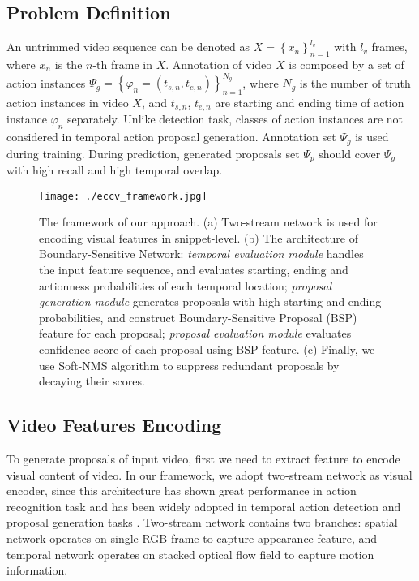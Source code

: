 \documentclass[runningheads]{llncs}
\begin{document}
\subsection{Problem Definition}


An untrimmed video sequence can be denoted as $X=\left \{ x_n \right \}_{n=1}^{l_v}$ with $l_v$  frames, where $x_n$ is the $n$-th frame in $X$.
Annotation of video $X$ is composed by a set of action instances $\Psi_g  = \left \{ \varphi  _n=\left (t_{s,n},t_{e,n}   \right ) \right \}_{n=1}^{N_g}$, where $N_g$ is the number of truth action instances in video  $X$, and $t_{s,n}$, $t_{e,n} $ are starting and ending time of action instance $\varphi_n$ separately.
Unlike  detection task, classes of action instances are not considered in temporal action proposal generation.
Annotation set $\Psi_g$ is used during training. During prediction, generated proposals set $\Psi_p$ should cover $\Psi_g$ with high recall and high temporal overlap.

\begin{figure*}%
\setlength{\abovecaptionskip}{-0.4cm} %
\setlength{\belowcaptionskip}{-0.5cm} %
\begin{center}
\begin{minipage}[b]{1.0\linewidth}
  \centering
  \centerline{\texttt{[image: ./eccv\_framework.jpg]}}
  \medskip
\end{minipage}
\end{center}
   \caption{The framework of our approach. (a) Two-stream network is used for encoding visual features in snippet-level. (b) The architecture of Boundary-Sensitive Network: \emph{temporal evaluation module} handles the input feature sequence, and evaluates starting, ending  and actionness probabilities of each temporal location; \emph{proposal generation module} generates proposals with high starting and ending probabilities, and construct Boundary-Sensitive Proposal (BSP) feature for each proposal; \emph{proposal evaluation module} evaluates confidence score of each proposal using BSP feature. (c) Finally, we use Soft-NMS algorithm  to suppress redundant proposals by decaying their scores. }
\label{fig_framework}
\end{figure*}

\subsection{Video Features Encoding}

To generate proposals of input video, first we need to extract feature to encode visual content of video.
In our framework, we adopt two-stream network \cite{simonyan2014two} as visual encoder, since this architecture has shown great performance in action recognition task \cite{wang2016temporal} and has been widely adopted in temporal action detection and proposal generation tasks \cite{zhao2017temporal,ssad,gao2017cascaded}.
Two-stream network contains two branches: spatial network  operates on single RGB frame to capture appearance feature, and temporal network operates on stacked optical flow field to capture motion information.
\end{document}
